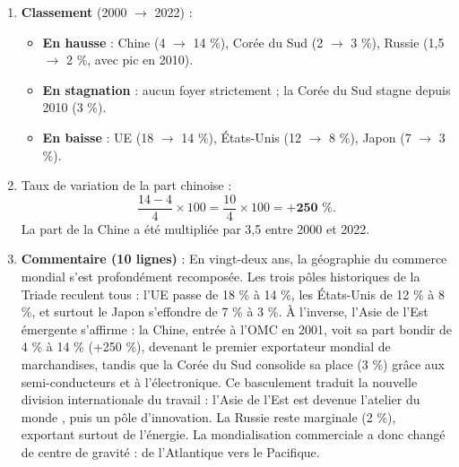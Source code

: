 \documentclass[11pt]{article}
\begin{document}
\begin{corrige}
\begin{enumerate}
\item \textbf{Classement} (2000 $\rightarrow$ 2022) :
\begin{itemize}
\item \textbf{En hausse} : Chine (4 $\rightarrow$ 14 \%), Corée du Sud (2 $\rightarrow$ 3 \%), Russie (1,5 $\rightarrow$ 2 \%, avec pic en 2010).
\item \textbf{En stagnation} : aucun foyer strictement ; la Corée du Sud stagne depuis 2010 (3 \%).
\item \textbf{En baisse} : UE (18 $\rightarrow$ 14 \%), États-Unis (12 $\rightarrow$ 8 \%), Japon (7 $\rightarrow$ 3 \%).
\end{itemize}
\item Taux de variation de la part chinoise :
\[ \frac{14 - 4}{4} \times 100 = \frac{10}{4} \times 100 = \textbf{+250\ \%}. \]
La part de la Chine a été multipliée par 3,5 entre 2000 et 2022.
\item \textbf{Commentaire (10 lignes)} : En vingt-deux ans, la géographie du commerce mondial s'est profondément recomposée. Les trois pôles historiques de la Triade reculent tous : l'UE passe de 18 \% à 14 \%, les États-Unis de 12 \% à 8 \%, et surtout le Japon s'effondre de 7 \% à 3 \%. À l'inverse, l'Asie de l'Est émergente s'affirme : la Chine, entrée à l'OMC en 2001, voit sa part bondir de 4 \% à 14 \% (+250 \%), devenant le premier exportateur mondial de marchandises, tandis que la Corée du Sud consolide sa place (3 \%) grâce aux semi-conducteurs et à l'électronique. Ce basculement traduit la nouvelle division internationale du travail : l'Asie de l'Est est devenue \og l'atelier du monde \fg{}, puis un pôle d'innovation. La Russie reste marginale (2 \%), exportant surtout de l'énergie. La mondialisation commerciale a donc changé de centre de gravité : de l'Atlantique vers le Pacifique.
\end{enumerate}
\end{corrige}
\end{document}
